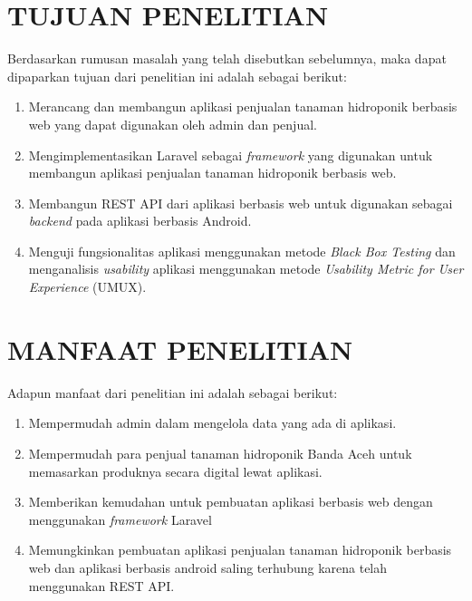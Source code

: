 \section{\uppercase{TUJUAN PENELITIAN}}
Berdasarkan rumusan masalah yang telah disebutkan sebelumnya, maka dapat dipaparkan tujuan dari penelitian ini adalah sebagai berikut:
\begin{enumerate}
	\item Merancang dan membangun aplikasi penjualan tanaman hidroponik berbasis web yang dapat digunakan oleh admin dan penjual.
	\item Mengimplementasikan Laravel sebagai \textit{framework} yang digunakan untuk membangun aplikasi penjualan tanaman hidroponik berbasis web.
	\item Membangun REST API dari aplikasi berbasis web untuk digunakan sebagai \textit{backend} pada aplikasi berbasis Android.
	\item  Menguji fungsionalitas aplikasi menggunakan metode \textit{Black Box Testing} dan menganalisis \textit{usability} aplikasi menggunakan metode \textit{Usability Metric for User Experience} (UMUX).
\end{enumerate}


\section{\uppercase{MANFAAT PENELITIAN}}
Adapun manfaat dari penelitian ini adalah sebagai berikut:
\begin{enumerate}
	\item Mempermudah admin dalam mengelola data yang ada di aplikasi.
	\item Mempermudah para penjual tanaman hidroponik Banda Aceh untuk memasarkan produknya secara digital lewat aplikasi.
	\item Memberikan kemudahan untuk pembuatan aplikasi berbasis web dengan menggunakan \textit{framework} Laravel
	\item Memungkinkan pembuatan aplikasi penjualan tanaman hidroponik berbasis web dan aplikasi berbasis android saling terhubung karena telah menggunakan REST API.
\end{enumerate}

\begin{comment}

\end{comment}
